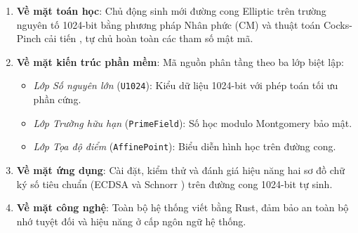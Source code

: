 \begin{enumerate}
\def\labelenumi{\arabic{enumi}.}
\tightlist
\item
  \textbf{Về mặt toán học}: Chủ động sinh mới đường cong Elliptic trên
  trường nguyên tố 1024-bit bằng phương pháp Nhân phức (CM) và thuật
  toán Cocks-Pinch cải tiến \citep{CocksPinch2001}, tự chủ hoàn toàn các
  tham số mật mã.
\item
  \textbf{Về mặt kiến trúc phần mềm}: Mã nguồn phân tầng theo ba lớp
  biệt lập:

  \begin{itemize}
  \tightlist
  \item
    \emph{Lớp Số nguyên lớn} (\texttt{U1024}): Kiểu dữ liệu 1024-bit với
    phép toán tối ưu phần cứng.
  \item
    \emph{Lớp Trường hữu hạn} (\texttt{PrimeField}): Số học modulo
    Montgomery bảo mật.
  \item
    \emph{Lớp Tọa độ điểm} (\texttt{AffinePoint}): Biểu diễn hình học
    trên đường cong.
  \end{itemize}
\item
  \textbf{Về mặt ứng dụng}: Cài đặt, kiểm thử và đánh giá hiệu năng hai
  sơ đồ chữ ký số tiêu chuẩn (ECDSA \citep{FIPS186_4} và Schnorr
  \citep{Schnorr1989}) trên đường cong 1024-bit tự sinh.
\item
  \textbf{Về mặt công nghệ}: Toàn bộ hệ thống viết bằng Rust, đảm bảo an
  toàn bộ nhớ tuyệt đối và hiệu năng ở cấp ngôn ngữ hệ thống.
\end{enumerate}

\FloatBarrier
